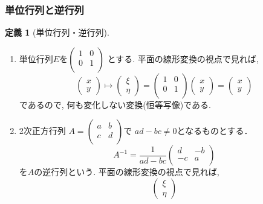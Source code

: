 \documentclass[dvipdfmx,a4paper,11pt]{article}
\theoremstyle{definition}
\newtheorem{dfn}[thm]{定義}
\begin{document}
\subsubsection{単位行列と逆行列}
\begin{tcolorbox}[
    colback = white,
    colframe = green!35!black,
    fonttitle = \bfseries,
    breakable = true]
    \begin{dfn}[単位行列・逆行列]
    \text{}
    \begin{enumerate}
    \setlength{\parskip}{0cm} 
  \setlength{\itemsep}{0cm}
  \item 単位行列$E$を$
  \begin{pmatrix}
 1& 0  \\
 0& 1  \\
 \end{pmatrix} 
 $
 とする. 
 平面の線形変換の視点で見れば, 
 $$
\begin{pmatrix}
x \\ y
 \end{pmatrix} 
 \longmapsto  
  \begin{pmatrix}
\xi  \\ \eta
 \end{pmatrix}
  =
 \begin{pmatrix}
1 &  0 \\ 0 & 1\\
 \end{pmatrix}
 \begin{pmatrix}
x \\ y
 \end{pmatrix} 
=
 \begin{pmatrix}
x \\ y
 \end{pmatrix} 
  $$
  であるので, 何も変化しない変換(恒等写像)である.
  \item 2次正方行列
 $A=
  \begin{pmatrix}
 a& b  \\
 c& d  \\
 \end{pmatrix} 
 $で
  $ad-bc \neq 0$となるものとする． 
 $$
 A^{-1} =   
 \frac{1}{ad-bc}
 \begin{pmatrix}
 d& -b  \\
 -c& a  \\
 \end{pmatrix} 
 $$
 を$A$の逆行列という.
  平面の線形変換の視点で見れば, 
  $$
  \begin{pmatrix}
\xi  \\ \eta
 \end{pmatrix}
$$
\end{enumerate}
\end{dfn}
\end{tcolorbox}
\end{document}

